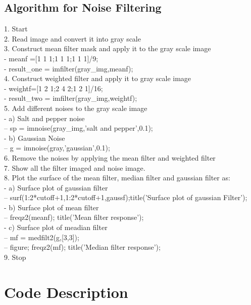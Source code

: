\documentclass[12pt]{article}
\begin{document}
\subsection{Algorithm for Noise Filtering}
1. Start\\
2. Read image and convert it into gray scale\\
3. Construct mean filter mask and apply it to the gray scale image\\ 
- \quad meanf =[1 1 1;1 1 1;1 1 1]/9;\\
- \quad result\_one = imfilter(gray\_img,meanf);\\
4. Construct weighted filter and apply it to gray scale image\\
- \quad weightf=[1 2 1;2 4 2;1 2 1]/16;\\
- \quad result\_two = imfilter(gray\_img,weightf);\\
5. Add different noises to the gray scale image \\
- \quad a) Salt and pepper noise\\
-- \qquad sp = imnoise(gray\_img,'salt and pepper',0.1);\\
- \quad b) Gaussian Noise\\
-- \qquad g = imnoise(gray,'gaussian',0.1);\\
6. Remove the noises by applying the mean filter and weighted filter\\
7. Show all the filter imaged and noise image.\\
8. Plot the surface of the mean filter, median filter and gaussian filter as:\\
- \quad a) Surface plot of gaussian filter\\
-- \qquad surf(1:2*cutoff+1,1:2*cutoff+1,gaussf);title('Surface plot of gaussian Filter');\\
- \quad b) Surface plot of mean filter\\
-- \qquad freqz2(meanf); title('Mean filter response');\\
- \quad c) Surface plot of meadian filter\\
-- \qquad mf = medfilt2(g,[3,3]);\\
-- \qquad figure; freqz2(mf); title('Median filter response');\\
9. Stop
\pagebreak
\section{Code Description}
\end{document}
